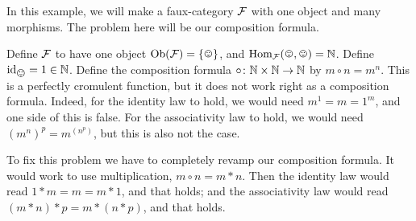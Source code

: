 \begin{example}

In this example, we will make a faux-category $\mathcal{F}$ with one object and many morphisms. The problem here will be our composition formula. 

Define $\mathcal{F}$ to have one object $\Ob(\mcF)=\singleton$, and $\Hom_\mcF(\smiley,\smiley)=\NN$. Define $\id_{\smiley}=1\in\NN$. Define the composition formula $\circ\colon{\mathbb N}\times{\mathbb N}\rightarrow{\mathbb N}$ by $m\circ n=m^n$. This is a perfectly cromulent function, but it does not work right as a composition formula. Indeed, for the identity law to hold, we would need $m^1=m=1^m$, and one side of this is false. For the associativity law to hold, we would need $(m^n)^p=m^{(n^p)}$, but this is also not the case.

To fix this problem we have to completely revamp our composition formula. It would work to use multiplication, $m\circ n=m*n$. Then the identity law would read $1*m=m=m*1$, and that holds; and the associativity law would read $(m*n)*p=m*(n*p)$, and that holds.

\end{example}

